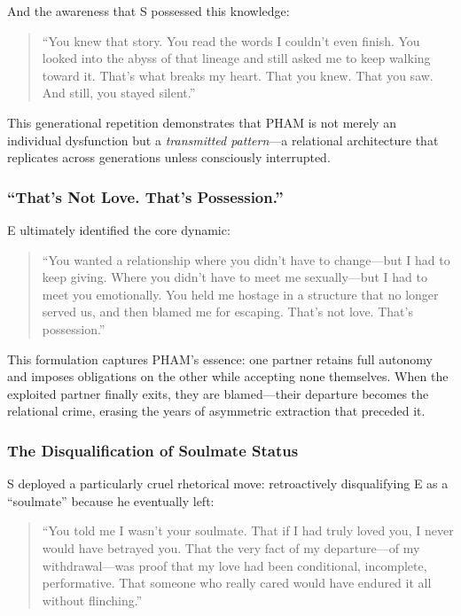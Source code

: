 \documentclass[12pt, letterpaper]{article}
\begin{document}
And the awareness that S possessed this knowledge:

\begin{quote}
``You knew that story. You read the words I couldn't even finish. You looked into the abyss of that lineage and still asked me to keep walking toward it. That's what breaks my heart. That you knew. That you saw. And still, you stayed silent.''
\end{quote}

This generational repetition demonstrates that PHAM is not merely an individual dysfunction but a \textit{transmitted pattern}---a relational architecture that replicates across generations unless consciously interrupted.

\subsubsection{``That's Not Love. That's Possession.''}

E ultimately identified the core dynamic:

\begin{quote}
``You wanted a relationship where you didn't have to change---but I had to keep giving. Where you didn't have to meet me sexually---but I had to meet you emotionally. You held me hostage in a structure that no longer served us, and then blamed me for escaping. That's not love. That's possession.''
\end{quote}

This formulation captures PHAM's essence: one partner retains full autonomy and imposes obligations on the other while accepting none themselves. When the exploited partner finally exits, they are blamed---their departure becomes the relational crime, erasing the years of asymmetric extraction that preceded it.

\subsubsection{The Disqualification of Soulmate Status}

S deployed a particularly cruel rhetorical move: retroactively disqualifying E as a ``soulmate'' because he eventually left:

\begin{quote}
``You told me I wasn't your soulmate. That if I had truly loved you, I never would have betrayed you. That the very fact of my departure---of my withdrawal---was proof that my love had been conditional, incomplete, performative. That someone who really cared would have endured it all without flinching.''
\end{quote}
\end{document}
